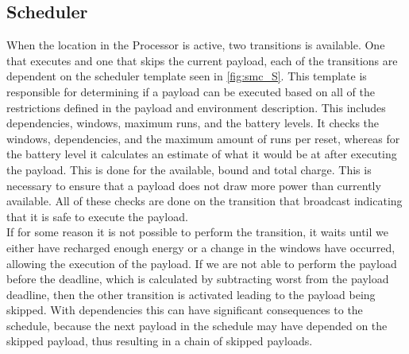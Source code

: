 \subsection{Scheduler}
When the location  in the Processor is active, two transitions is available. 
One that executes and one that skips the current payload, each of the transitions are dependent on the scheduler template seen in \cref{fig:smc_S}.
This template is responsible for determining if a payload can be executed based on all of the restrictions defined in the payload and environment description.
This includes dependencies, windows, maximum runs, and the battery levels.
It checks the windows, dependencies, and the maximum amount of runs per reset, whereas for the battery level it calculates an estimate of what it would be at after executing the payload. 
This is done for the available, bound and total charge.
This is necessary to ensure that a payload does not draw more power than currently available.
All of these checks are done on the transition that broadcast  indicating that it is safe to execute the payload.\\
If for some reason it is not possible to perform the transition, it waits until we either have recharged enough energy or a change in the windows have occurred, allowing the execution of the payload.
If we are not able to perform the payload before the deadline, which is calculated by subtracting worst from the payload deadline, then the other transition is activated leading to the payload being skipped.
With dependencies this can have significant consequences to the schedule, because the next payload in the schedule may have depended on the skipped payload, thus resulting in a chain of skipped payloads.

